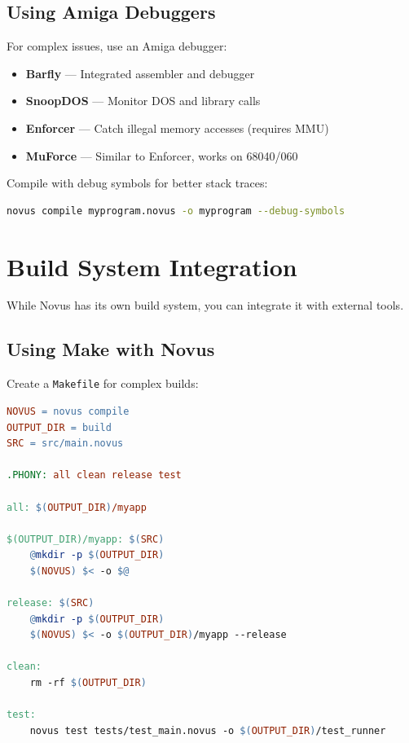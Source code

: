 \subsection{Using Amiga Debuggers}

For complex issues, use an Amiga debugger:

\begin{itemize}
    \item \textbf{Barfly} --- Integrated assembler and debugger
    \item \textbf{SnoopDOS} --- Monitor DOS and library calls
    \item \textbf{Enforcer} --- Catch illegal memory accesses (requires MMU)
    \item \textbf{MuForce} --- Similar to Enforcer, works on 68040/060
\end{itemize}

Compile with debug symbols for better stack traces:

\begin{lstlisting}[language=bash]
novus compile myprogram.novus -o myprogram --debug-symbols
\end{lstlisting}

\section{Build System Integration}
\label{sec:build-integration}

While Novus has its own build system, you can integrate it with external tools.

\subsection{Using Make with Novus}

Create a \texttt{Makefile} for complex builds:

\begin{lstlisting}[language=make]
NOVUS = novus compile
OUTPUT_DIR = build
SRC = src/main.novus

.PHONY: all clean release test

all: $(OUTPUT_DIR)/myapp

$(OUTPUT_DIR)/myapp: $(SRC)
	@mkdir -p $(OUTPUT_DIR)
	$(NOVUS) $< -o $@

release: $(SRC)
	@mkdir -p $(OUTPUT_DIR)
	$(NOVUS) $< -o $(OUTPUT_DIR)/myapp --release

clean:
	rm -rf $(OUTPUT_DIR)

test:
	novus test tests/test_main.novus -o $(OUTPUT_DIR)/test_runner
\end{lstlisting}

